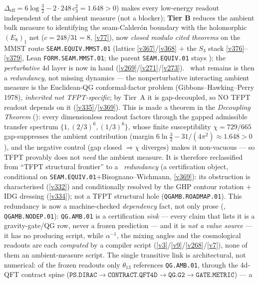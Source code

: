 \documentclass[11pt,a4paper]{article}
\newcommand{\cthree}{c_3}
\begin{document}
\begin{keybox}
$\Delta_{\mathrm{eff}}=6\log\tfrac32-2{\cdot}248\,\cthree^2=1.648>0$) makes every low-energy readout independent of
the ambient measure (not a blocker); \textbf{Tier B} reduces the ambient bulk measure to identifying the
seam-Calder\'on boundary with the holomorphic $(E_8)_1$ net ($c{=}248/31{=}8$, \vref{v77}), now \emph{closed modulo
cited theorems} on the MMST route \texttt{SEAM.EQUIV.MMST.01} (lattice \vref{v367}/\vref{v368} $+$ the $S_3$ stack
\vref{v376}--\vref{v379}, Lean
\texttt{FORM.SEAM.MMST.01}; the parent \texttt{SEAM.EQUIV.01} stays \mO);
the \emph{perturbative} 4d layer is now in hand (\vref{v269}/\vref{v271}/\vref{v273}). \mC\ what remains is then a
\emph{redundancy}, not missing dynamics --- the nonperturbative interacting ambient measure is the Euclidean-QG
conformal-factor problem (Gibbons--Hawking--Perry 1978), \emph{inherited not TFPT-specific}; by Tier~A it is
gap-decoupled, so NO TFPT readout depends on it (\vref{v335}/\vref{v369}).  This is made a theorem in the
\emph{Decoupling Theorem} (): every dimensionless readout factors through the
gapped admissible transfer spectrum $\{1,(2/3)^6,(1/3)^6\}$, whose finite susceptibility $\chi=729/665$
gap-suppresses the ambient contribution (margin $6\ln\tfrac32-31/(4\pi^2)\approx1.648>0$), and the negative control
(gap closed $\Rightarrow \chi$ diverges) makes it non-vacuous --- so TFPT provably does not \emph{need} the ambient
measure.  It is therefore reclassified from ``TFPT structural frontier'' to a \mC\ \emph{redundancy} (a certification
object, conditional on \texttt{SEAM.EQUIV.01}${+}$Bisognano--Wichmann, \vref{v369}): its obstruction is characterised
(\vref{v332}) and conditionally resolved by the GHP contour rotation $+$ IDG dressing (\vref{v334}); not a TFPT
structural hole (\texttt{QGAMB.ROADMAP.01}).
This redundancy is now a machine-checked \emph{dependency} fact, not only prose
(, \texttt{QGAMB.NODEP.01}): \texttt{QG.AMB.01} is a
certification \emph{sink} --- every claim that lists it is a gravity-gate/QG row, never a frozen
prediction --- and it is \emph{not a value source} --- it has no producing script, while $\alpha^{-1}$,
the mixing angles and the cosmological readouts are each \emph{computed} by a compiler script
(\vref{v3}/\vref{v9}/\vref{v268}/\vref{v7}), none of them an ambient-measure script. The single
transitive link is architectural, not numerical: of the frozen readouts only $\theta_{13}$ references
\texttt{QG.AMB.01}, through the 4d-QFT contract spine
($\texttt{PS.DIRAC}{\to}\texttt{CONTRACT.QFT4D}{\to}\texttt{QG.G2}{\to}\texttt{GATE.METRIC}$) --- a

\end{keybox}
\end{document}
